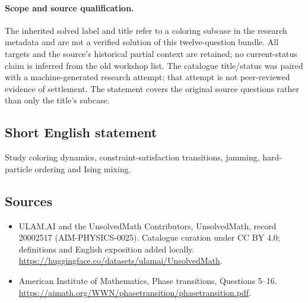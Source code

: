 \documentclass[11pt]{article}
\begin{document}
\paragraph{Scope and source qualification.}The inherited solved label and title refer to a coloring subcase in the research metadata and are not a verified solution of this twelve-question bundle. All targets and the source’s historical partial context are retained; no current-status claim is inferred from the old workshop list. The catalogue title/status was paired with a machine-generated research attempt; that attempt is not peer-reviewed evidence of settlement. The statement covers the original source questions rather than only the title’s subcase.
\subsection{Short English statement}
Study coloring dynamics, constraint-satisfaction transitions, jamming, hard-particle ordering and Ising mixing.
\subsection{Sources}
\begin{itemize}
\item[\hypertarget{source:20002517:1}{S1}] ULAM.AI and the UnsolvedMath Contributors, UnsolvedMath, record 20002517 (AIM-PHYSICS-0025). Catalogue curation under CC BY 4.0; definitions and English exposition added locally.
\url{https://huggingface.co/datasets/ulamai/UnsolvedMath}.
\item[\hypertarget{source:20002517:2}{S2}] American Institute of Mathematics, Phase transitions, Questions 5–16.
\url{https://aimath.org/WWN/phasetransition/phasetransition.pdf}.
\end{itemize}
\label{end:20002517}
\end{document}
